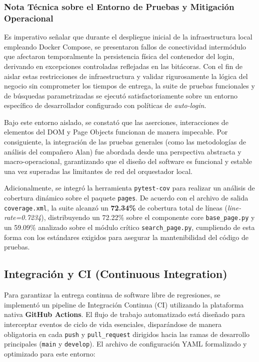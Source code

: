 \documentclass[12pt,letterpaper]{article}
\begin{document}
\subsubsection{Nota Técnica sobre el Entorno de Pruebas y Mitigación Operacional}
Es imperativo señalar que durante el despliegue inicial de la infraestructura local empleando Docker Compose, se presentaron fallos de conectividad intermódulo que afectaron temporalmente la persistencia física del contenedor del login, derivando en excepciones controladas reflejadas en las bitácoras. Con el fin de aislar estas restricciones de infraestructura y validar rigurosamente la lógica del negocio sin comprometer los tiempos de entrega, la suite de pruebas funcionales y de búsquedas parametrizadas se ejecutó satisfactoriamente sobre un entorno específico de desarrollador configurado con políticas de \textit{auto-login}. 

Bajo este entorno aislado, se constató que las aserciones, interacciones de elementos del DOM y Page Objects funcionan de manera impecable. Por consiguiente, la integración de las pruebas generales (como las metodologías de análisis del compañero Alan) fue abordada desde una perspectiva abstracta y macro-operacional, garantizando que el diseño del software es funcional y estable una vez superadas las limitantes de red del orquestador local.

Adicionalmente, se integró la herramienta \texttt{pytest-cov} para realizar un análisis de cobertura dinámico sobre el paquete \texttt{pages}. De acuerdo con el archivo de salida \texttt{coverage.xml}, la suite alcanzó un \textbf{72.34\%} de cobertura total de líneas (\textit{line-rate=0.7234}), distribuyendo un 72.22\% sobre el componente core \texttt{base\_page.py} y un 59.09\% analizado sobre el módulo crítico \texttt{search\_page.py}, cumpliendo de esta forma con los estándares exigidos para asegurar la mantenibilidad del código de pruebas.

\newpage

\subsection{Integración y CI (Continuous Integration)}
Para garantizar la entrega continua de software libre de regresiones, se implementó un pipeline de Integración Continua (CI) utilizando la plataforma nativa \textbf{GitHub Actions}. El flujo de trabajo automatizado está diseñado para interceptar eventos de ciclo de vida esenciales, disparándose de manera obligatoria en cada \texttt{push} y \texttt{pull\_request} dirigidos hacia las ramas de desarrollo principales (\texttt{main} y \texttt{develop}).
El archivo de configuración YAML formalizado y optimizado para este entorno:
\end{document}
